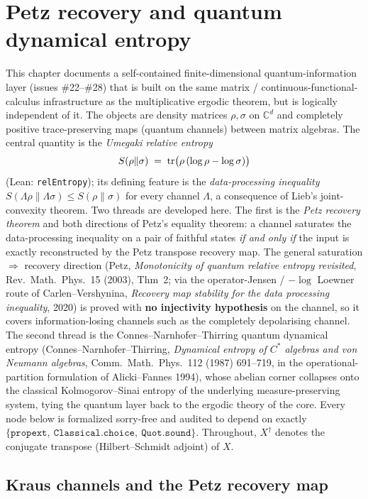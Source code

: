 \chapter{Petz recovery and quantum dynamical entropy}
\label{chap:petz}

This chapter documents a self-contained finite-dimensional quantum-information layer
(issues \#22--\#28) that is built on the same matrix / continuous-functional-calculus
infrastructure as the multiplicative ergodic theorem, but is logically independent of it.
The objects are density matrices \(\rho,\sigma\) on \(\mathbb{C}^d\) and completely positive
trace-preserving maps (quantum channels) between matrix algebras. The central quantity is the
\emph{Umegaki relative entropy}
\[
  S(\rho\|\sigma) \;=\; \operatorname{tr}\bigl(\rho\,(\log\rho-\log\sigma)\bigr)
\]
(Lean: \texttt{relEntropy}); its defining feature is the \emph{data-processing inequality}
\(S(\Lambda\rho\|\Lambda\sigma)\le S(\rho\|\sigma)\) for every channel \(\Lambda\), a consequence
of Lieb's joint-convexity theorem. Two threads are developed here. The first is the
\emph{Petz recovery theorem} and both directions of Petz's equality theorem: a channel saturates
the data-processing inequality on a pair of faithful states \emph{if and only if} the input is
exactly reconstructed by the Petz transpose recovery map. The general saturation \(\Rightarrow\)
recovery direction (Petz, \emph{Monotonicity of quantum relative entropy revisited},
Rev.\ Math.\ Phys.\ 15 (2003), Thm~2; via the operator-Jensen / \(-\log\) Loewner route of
Carlen--Vershynina, \emph{Recovery map stability for the data processing inequality}, 2020) is
proved with \textbf{no injectivity hypothesis} on the channel, so it covers information-losing
channels such as the completely depolarising channel. The second thread is the
Connes--Narnhofer--Thirring quantum dynamical entropy (Connes--Narnhofer--Thirring, \emph{Dynamical
entropy of \(C^{*}\) algebras and von Neumann algebras}, Comm.\ Math.\ Phys.\ 112 (1987) 691--719,
in the operational-partition formulation of Alicki--Fannes 1994), whose abelian corner collapses
onto the classical Kolmogorov--Sinai entropy of the underlying measure-preserving system, tying the
quantum layer back to the ergodic theory of the core. Every node below is formalized sorry-free and
audited to depend on exactly \(\{\texttt{propext},\ \texttt{Classical.choice},\ \texttt{Quot.sound}\}\).
Throughout, \(X^{\dagger}\) denotes the conjugate transpose (Hilbert--Schmidt adjoint) of \(X\).

\section{Kraus channels and the Petz recovery map}
\label{sec:petz-kraus}

